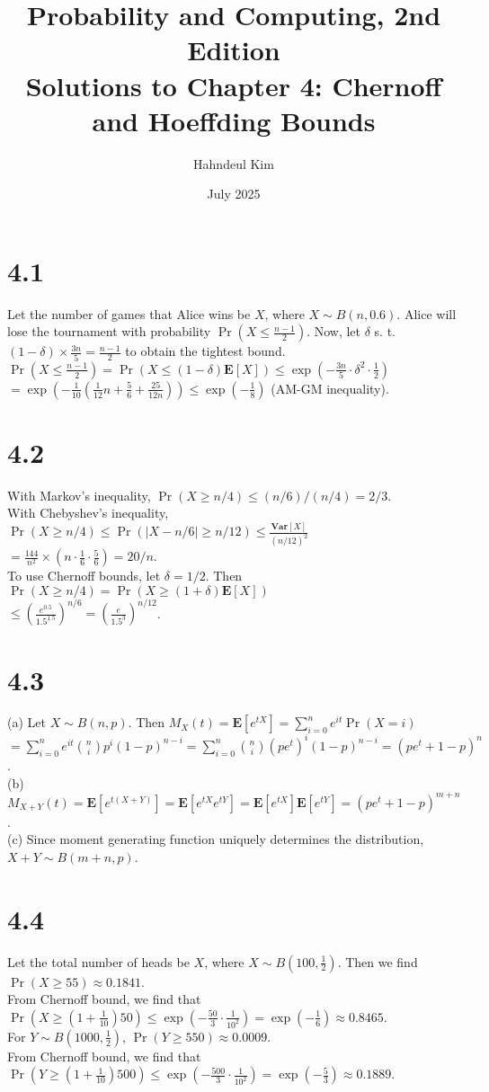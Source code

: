 \documentclass{article}
\title {Probability and Computing, 2nd Edition \\[2ex] \large Solutions to Chapter 4: Chernoff and Hoeffding Bounds}
\author{Hahndeul Kim}
\date{July 2025}
\begin{document}
\maketitle
\newpage
\section*{4.1}
Let the number of games that Alice wins be $X$, where $X\sim B(n,0.6)$. Alice will lose the tournament with probability $\Pr(X\leq \frac{n-1}{2})$.
Now, let $\delta$ s. t. $(1-\delta) \times \frac{3n}{5} = \frac{n-1}{2}$ to obtain the tightest bound.\\
$\Pr(X\leq \frac{n-1}{2})=\Pr(X\leq(1-\delta)\textbf{E}[X])\leq \exp(-\frac{3n}{5}\cdot \delta^2 \cdot \frac{1}{2})$\\
$=\exp(-\frac{1}{10}(\frac{1}{12}n+\frac{5}{6}+\frac{25}{12n}))\leq \exp(-\frac{1}{8})$ (AM-GM inequality).
\section*{4.2}
With Markov's inequality, $\Pr(X\geq n/4) \leq (n/6)/(n/4)=2/3$.\\
With Chebyshev's inequality, $\Pr(X\geq n/4) \leq \Pr(|X-n/6|\geq n/12)\leq \frac{\textbf{Var}[X]}{(n/12)^2}$\\
$=\frac{144}{n^2}\times(n\cdot \frac{1}{6}\cdot\frac{5}{6})=20/n$.\\
To use Chernoff bounds, let $\delta=1/2$. Then $\Pr(X\geq n/4)=\Pr(X\geq(1+\delta)\textbf{E}[X])$\\
$\leq\left(\frac{e^{0.5}}{1.5^{1.5}}\right)^{n/6}=\left(\frac{e}{1.5^3}\right)^{n/12}$.
\section*{4.3}
(a) Let $X\sim B(n,p)$. Then $M_X(t)=\textbf{E}[e^{tX}]=\sum\limits_{i=0}^ne^{it}\Pr(X=i)$\\
$=\sum\limits_{i=0}^ne^{it}\binom{n}{i}p^i(1-p)^{n-i}=\sum\limits_{i=0}^n\binom{n}{i}(pe^t)^i(1-p)^{n-i}=(pe^t+1-p)^n$.\\
(b) $M_{X+Y}(t)=\textbf{E}[e^{t(X+Y)}]=\textbf{E}[e^{tX}e^{tY}]=\textbf{E}[e^{tX}]\textbf{E}[e^{tY}]=(pe^t+1-p)^{m+n}$.\\
(c) Since moment generating function uniquely determines the distribution, $X+Y\sim B(m+n,p)$.
\section*{4.4}
Let the total number of heads be $X$, where $X\sim B(100,\frac{1}{2})$. Then we find $\Pr(X\geq55)\approx0.1841$.\\
From Chernoff bound, we find that $\Pr(X\geq (1+\frac{1}{10})50)\leq \exp(-\frac{50}{3}\cdot\frac{1}{10^2})=\exp(-\frac{1}{6})\approx0.8465$.\\
For $Y\sim B(1000,\frac{1}{2})$, $\Pr(Y\geq 550)\approx0.0009$.\\
From Chernoff bound, we find that $\Pr(Y\geq (1+\frac{1}{10})500)\leq \exp(-\frac{500}{3}\cdot\frac{1}{10^2})=\exp(-\frac{5}{3})\approx0.1889$.\\
\end{document}
